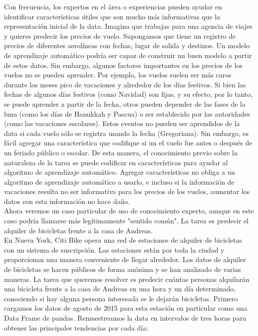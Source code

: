 Con frecuencia, los expertos en el área o experiencias  pueden ayudar en identificar características
útiles que son mucho más informativas que la representación inicial 
de la data.  Imagina que trabajas para una agencia de viajes y quieres predecir los precios de vuelo. 
Supongamos que tiene un registro de precios de diferentes  aerolíneas con fechas, lugar de salida
y destinos. Un modelo de aprendizaje automático podría ser capaz de construir un buen  modelo  a partir de estos datos.  Sin embargo, algunos factores importantes en los precios de los vuelos no se pueden aprender.
Por ejemplo, los vuelos suelen ser más caros durante los meses pico de vacaciones y
alrededor de los días festivos.
Si bien las fechas de algunos días festivos (como Navidad) son fijas, y
su efecto, por lo tanto, se puede aprender a partir de la fecha, otros pueden depender de las fases
de la luna (como los días de Hanukkah y Pascua) o ser establecido por las autoridades (como las vacaciones escolares). Estos eventos no  pueden  ser  aprendidos de la data si cada vuelo sólo se registra
usando la fecha (Gregoriana).  Sin embargo, es fácil agregar una característica  que codifique si un
el vuelo fue antes o después de un feriado público o escolar. 
De esta manera, el conocimiento previo sobre la naturaleza de la tarea se puede codificar en características para ayudar al algoritmo de aprendizaje automático.
 Agregar características no obliga a un algoritmo de aprendizaje automático a usarlo, e incluso si la información de vacaciones resulta no ser informativa  para los precios de los vuelos, aumentar los datos con esta información no hace daño. \\
 
 
Ahora veremos un caso particular de uso de conocimiento experto, aunque en este caso
podría llamarse más legítimamente "{}sentido común"{}.  La tarea es predecir el alquiler de bicicletas frente a la casa de Andreas.\\


En Nueva York, Citi Bike opera una red de estaciones de alquiler de bicicletas con un sistema de  suscripción.  Las estaciones están por toda la ciudad y proporcionan una manera conveniente de llegar
alrededor. Los datos de alquiler de bicicletas se hacen públicos de forma anónima y se han analizado de varias maneras.   La tarea que queremos resolver es predecir   cuántas personas alquilarán una bicicleta frente a la casa de Andreas en una hora y un día determinado, conociendo si hay alguna persona interesada  se le dejarán bicicletas.   Primero cargamos los datos de agosto de 2015 para esta estación en particular como una {\ttfamily Data Frame} de  {\ttfamily pandas}. Remuestreamos la data en intervalos de tres horas para obtener las principales tendencias por cada día:\\

